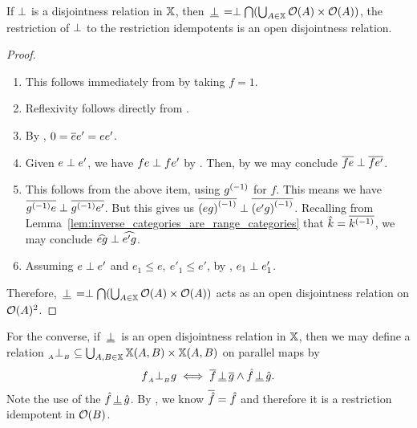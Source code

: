 \begin{proposition}\label{prop:disjointness_is_open_disjointness}
  If $\perp$ is a disjointness relation in $\mathbb{X}$, then $\,\underline{\perp}\, = \perp \bigcap
  (\bigcup_{A\in\mathbb{X}} \mathcal{O}({A})\times \mathcal{O}({A}))$, the restriction of $\perp$ to the restriction
  idempotents is an open disjointness relation.
\end{proposition}
\begin{proof}
  \prepprooflist
  \begin{enumerate}
    \item[\axiom{$\mathcal{O}$dis}{1}] This follows immediately from  by taking
      $f = 1$.
    \item[\axiom{$\mathcal{O}$dis}{2}] Reflexivity follows directly from  .
    \item[\axiom{$\mathcal{O}$dis}{3}] By , $0 = \overline{e} e' = e e'$.
    \item[\axiom{$\mathcal{O}$dis}{4}] Given $e \perp e'$, we have $f e \perp f e'$ by
      . Then, by  we may conclude $\overline{f e} \perp \overline{f e'}$.
    \item[\axiom{$\mathcal{O}$dis}{5}] This follows from the above item, using ${g}^{(-1)}$ for $f$.
      This means we have $\overline{{g}^{(-1)}e} \perp \overline{{g}^{(-1)}e'}$. But this gives us $\overline{{(e
      g)}^{(-1)}} \perp \overline{{(e' g)}^{(-1)}}$. Recalling from
      Lemma~\ref{lem:inverse_categories_are_range_categories} that $\hat{k} = \overline{{k}^{(-1)}}$, we may
      conclude $\widehat{e g} \perp \widehat{e' g}$.
    \item[\axiom{$\mathcal{O}$dis}{6}] Assuming $e \perp e'$ and $e_1 \le e,\ e'_1 \le e'$, by
      , $e_1 \perp e'_1$.
  \end{enumerate}
  Therefore, $\,\underline{\perp}\, = \perp \bigcap (\bigcup_{A\in\mathbb{X}} \mathcal{O}({A})\times \mathcal{O}({A}))$ acts as an
  open disjointness relation on $\mathcal{O}({A})^2$.

\end{proof}

For the converse, if $\,\underline{\perp}\,$ is an open disjointness relation in $\mathbb{X}$, then we may define a relation
${}_{{}_{A}}{\perp_{{}_{B}}} \subseteq \bigcup_{A,B\in\mathbb{X}} \mathbb{X}(A,B)\times \mathbb{X}(A,B)$ on parallel maps by
\[
  f{}_{{}_{A}}{\perp_{{}_{B}}} g \iff  \overline{f}\,\underline{\perp}\,\overline{g} \wedge \hat{f}\,\underline{\perp}\,\hat{g}.
\]
Note the use of the $\hat{f}\,\underline{\perp}\,\hat{g}$. By \rrone, we know $\overline{\hat{f}} = \hat{f}$ and
therefore it is a restriction idempotent in $\mathcal{O}({B})$.

